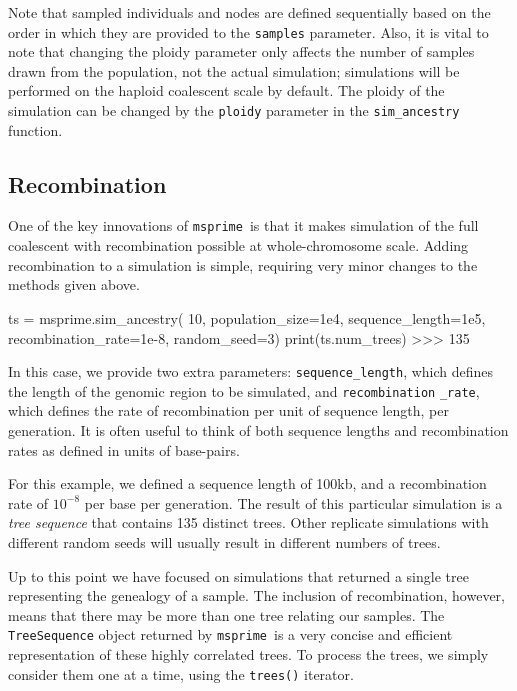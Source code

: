 \documentclass[graybox]{svmult}
\newcommand{\msprime}[0]{\texttt{msprime}}
\begin{document}
Note that sampled individuals and nodes are defined sequentially based
on the order in which they are provided to the \texttt{samples} parameter. Also, it is vital
to note that changing the ploidy parameter only affects the number of samples drawn from
the population, not the actual simulation; simulations will be performed on the
haploid coalescent scale by default. The ploidy of the simulation can be changed by the
\texttt{ploidy} parameter in the \texttt{sim\_ancestry} function.


\subsection{Recombination}\label{recombination}

One of the key innovations of \msprime\ is that it makes simulation of the
full coalescent with recombination possible at whole-chromosome scale.
Adding recombination to a simulation is simple, requiring very minor
changes to the methods given above.

\begin{pythoncode}
ts = msprime.sim_ancestry(
    10, population_size=1e4, sequence_length=1e5,
    recombination_rate=1e-8, random_seed=3)
print(ts.num_trees)
>>> 135
\end{pythoncode}

    In this case, we provide two extra parameters: \texttt{sequence\_length}, which
defines the length of the genomic region to be simulated, and
\texttt{recombination} \texttt{\_rate}, which defines the rate of recombination
per unit of sequence length, per generation. It is often useful to
think of both sequence lengths and recombination rates as defined in units of base-pairs.

For this example, we defined a sequence length of 100kb, and a recombination rate of
\(10^{-8}\) per base per generation. The result of this particular simulation is a
\emph{tree sequence} that contains 135 distinct trees. Other replicate
simulations with different random seeds will usually result in different
numbers of trees.

Up to this point we have focused on simulations that returned a single
tree representing the genealogy of a sample. The inclusion of
recombination, however, means that there may be more than one tree
relating our samples. The \texttt{TreeSequence} object returned by
\msprime\ is a very concise and efficient representation of these highly
correlated trees. To process the trees, we simply consider
them one at a time, using the \texttt{trees()} iterator.
\end{document}
